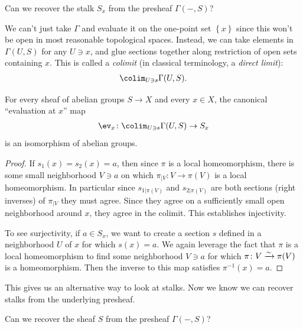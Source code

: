 \documentclass[11pt]{book}
\begin{document}
\begin{question} Can we recover the stalk $S_x$ from the presheaf $\Gamma(-,S)$?
\end{question}

We can't just take $\Gamma$ and evaluate it on the one-point set $\left\{ x \right\}$ since this won't be open in most reasonable topological spaces. Instead, we can take elements in $\Gamma(U,S)$ for any $U \ni x$, and glue sections together along restriction of open sets containing $x$. This is called a \emph{colimit} (in classical terminology, a \emph{direct limit}):
\begin{align*}
    \colim_{U\ni s}\Gamma(U,S).
\end{align*}
%
\begin{proposition}\label{prop:colimit-sections-is-stalk}
For every sheaf of abelian groups $S \to X$ and every $x\in X$, the canonical ``evaluation at $x$'' map
\begin{align*}
    \ev_x \colon \colim_{U\ni s} \Gamma(U,S) \to S_x
\end{align*}
is an isomorphism of abelian groups.
\end{proposition}
\begin{proof} If $s_1(x) = s_2(x) = a$, then since $\pi$ is a local homeomorphism, there is some small neighborhood $V \ni a$ on which $\pi_{|V} \colon V \to \pi(V)$ is a local homeomorphism. In particular since $s_{1|\pi(V)}$ and $s_{2|\pi(V)}$ are both sections (right inverses) of $\pi_{|V}$ they must agree. Since they agree on a sufficiently small open neighborhood around $x$, they agree in the colimit. This establishes injectivity.

To see surjectivity, if $a\in S_x$, we want to create a section $s$ defined in a neighborhood $U$ of $x$ for which $s(x) = a$. We again leverage the fact that $\pi$ is a local homeomorphism to find some neighborhood $V \ni a$ for which $\pi \colon V \xrightarrow{\sim} \pi(V)$ is a homeomorphism. Then the inverse to this map satisfies $\pi^{-1}(x) = a$.
\end{proof}
This gives us an alternative way to look at stalks. Now we know we can recover stalks from the underlying presheaf.

\begin{question}\label{ques:recover-sheaf-from-presheaf} 
Can we recover the sheaf $S$ from the presheaf $\Gamma(-,S)$?
\end{question}
\end{document}
